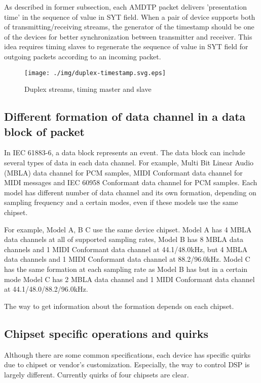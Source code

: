 \documentclass[onecolumn]{article}
\begin{document}
As described in former subsection, each AMDTP packet delivers 'presentation time' in the sequence of value in SYT field. When a pair of device supports both of transmitting/receiving streams, the generator of the timestamp should be one of the devices for better synchronization between transmitter and receiver. This idea requires timing slaves to regenerate the sequence of value in SYT field for outgoing packets according to an incoming packet.

\begin{figure}[H]
	\centering
	\texttt{[image: ./img/duplex-timestamp.svg.eps]}
	\caption{{Duplex streams, timing master and slave}}
	\label{duplex-timestamp}
\end{figure}


\subsection{Different formation of data channel in a data block of packet}
\label{sec:formation-data-block}

In IEC 61883-6\cite{iec61883-6-1, iec61883-6-2}, a data block represents an event. The data block can include several types of data in each data channel. For example, Multi Bit Linear Audio (MBLA) data channel for PCM samples, MIDI Conformant data channel for MIDI messages and IEC 60958 Conformant data channel for PCM samples. Each model has different number of data channel and its own formation, depending on sampling frequency and a certain modes, even if these models use the same chipset.

For example, Model A, B C use the same device chipset. Model A has 4 MBLA data channels at all of supported sampling rates, Model B has 8 MBLA data channels and 1 MIDI Conformant data channel at 44.1/48.0kHz, but 4 MBLA data channels and 1 MIDI Conformant data channel at 88.2/96.0kHz. Model C has the same formation at each sampling rate as Model B has but in a certain mode Model C has 2 MBLA data channel and 1 MIDI Conformant data channel at 44.1/48.0/88.2/96.0kHz.

The way to get information about the formation depends on each chipset.

\subsection{Chipset specific operations and quirks}

Although there are some common specifications, each device has specific quirks due to chipset or vendor's customization. Especially, the way to control DSP is largely different. Currently quirks of four chipsets are clear.
\end{document}
